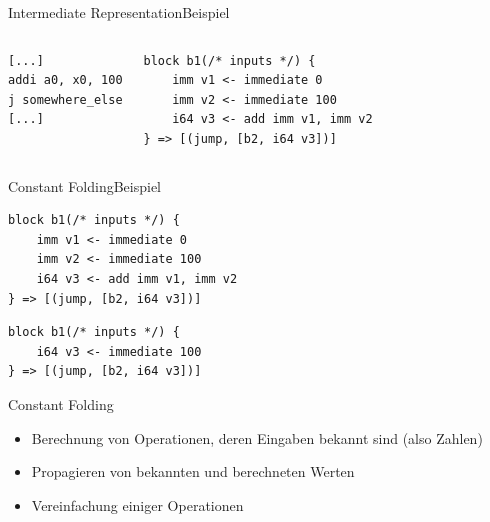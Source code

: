 \begin{frame}[fragile]{Intermediate Representation}{Beispiel}
    \vspace{1.5cm}
    \begin{columns}[c]
        \begin{lstlisting}[language=rv64]
[...]
addi a0, x0, 100
j somewhere_else
[...]
        \end{lstlisting}



        \begin{lstlisting}[language=SbtIr]
block b1(/* inputs */) {
    imm v1 <- immediate 0
    imm v2 <- immediate 100
    i64 v3 <- add imm v1, imm v2
} => [(jump, [b2, i64 v3])]
    \end{lstlisting}
    \end{columns}

\end{frame}
\clearpage

\begin{frame}[fragile]{Constant Folding}{Beispiel}
    \vspace{0.3cm}
    \begin{lstlisting}[language=SbtIr]
block b1(/* inputs */) {
    imm v1 <- immediate 0
    imm v2 <- immediate 100
    i64 v3 <- add imm v1, imm v2
} => [(jump, [b2, i64 v3])]
    \end{lstlisting}

    \pause

    \vspace{1.2cm}

    \begin{lstlisting}[language=SbtIr]
block b1(/* inputs */) {
    i64 v3 <- immediate 100
} => [(jump, [b2, i64 v3])]
    \end{lstlisting}

\end{frame}
\clearpage

\begin{frame}[fragile]{Constant Folding}
    \begin{itemize}
        \setlength\itemsep{0.5em}
        \item Berechnung von Operationen, deren Eingaben bekannt sind (also Zahlen) %
        \item Propagieren von bekannten und berechneten Werten
        \item Vereinfachung einiger Operationen %
    \end{itemize}
\end{frame}
\clearpage

